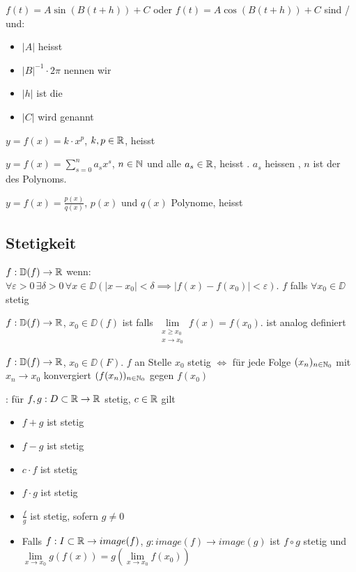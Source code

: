 \Def $f(t) = A \sin(B(t+h)) + C$ oder $f(t) = A\cos(B(t+h))+C$ sind / und:
\vspace{-0.6em}
\begin{itemize}
    \item $|A|$ heisst 
    \item $|B|^{-1} \cdot 2\pi$ nennen wir 
    \item $|h|$ ist die 
    \item $|C|$ wird  genannt
\end{itemize}

\Def $y = f(x) = k\cdot x^p$, $k,p \in \mathbb{R}$, heisst 

\Def $y = f(x) = \sum_{s=0}^{n} a_s x^s$, $n \in \mathbb{N}$ und alle $a_s \in \mathbb{R}$, heisst .
$a_s$ heissen , $n$ ist der  des Polynoms.

\Def $y = f(x) = \frac{p(x)}{q(x)}$, $p(x)$ und $q(x)$ Polynome, heisst 

\subsection{Stetigkeit}

\Def $f: \mathbb{D}(f) \to \mathbb{R}$  wenn:
$\forall \varepsilon > 0 \, \exists \delta > 0 \, \forall x \in \DD (|x - x_0| < \delta \implies |f(x) - f(x_0)| < \varepsilon)$.
$f$  falls $\forall x_0 \in \DD$ stetig

\Def $f: \mathbb{D}(f) \to \mathbb{R}$, $x_0 \in \DD(f)$ ist  falls
$\lim\limits_{\substack{x\ge x_0 \\ x \to x_0}} f(x) = f(x_0)$.
 ist analog definiert

\Satz $f: \mathbb{D}(f) \to \mathbb{R}$, $x_0 \in \DD(F)$. $f$ an Stelle $x_0$ stetig $\iff$
für jede Folge $(x_n)_{n\in\mathbb{N}_0}$ mit $x_n \to x_0$ konvergiert $(f(x_n))_{n\in\mathbb{N}_0}$ gegen $f(x_0)$

\Satz {}: für $f,g: D \subset \mathbb{R} \to \mathbb{R}$ stetig, $c \in \mathbb{R}$ gilt
\vspace{-0.6em}
\begin{itemize}
    \item $f + g$ ist stetig
    \item $f - g$ ist stetig
    \item $c \cdot f$ ist stetig
    \item $f \cdot g$ ist stetig
    \item $\frac{f}{g}$ ist stetig, sofern $g \ne 0$
    \item Falls $f: I \subset \mathbb{R} \to image(f)$, $g: image(f) \to image(g)$ ist
    $f \circ g$ stetig und $\lim\limits_{x\to x_0} g(f(x)) = g(\lim\limits_{x \to x_0}f(x_0))$
\end{itemize}

